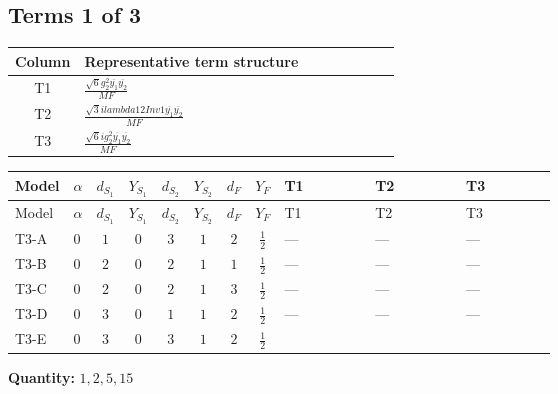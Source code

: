 \documentclass[8pt]{article}
\begin{document}
\begin{landscape}
\subsection*{Terms 1 of 3}
\begin{center}
\begin{tabular}{@{}c >{\raggedright\arraybackslash}p{0.82\linewidth}@{}}
\toprule
Column & Representative term structure \\
\midrule
T1 & \(\displaystyle \frac{\sqrt{6} g_{2}^{2} \overline{y_{1}} \overline{y_{2}}}{MF}\) \\
\midrule
T2 & \(\displaystyle \frac{\sqrt{3} i lambda12Inv1 \overline{y_{1}} \overline{y_{2}}}{MF}\) \\
\midrule
T3 & \(\displaystyle \frac{\sqrt{6} i g_{2}^{2} \overline{y_{1}} \overline{y_{2}}}{MF}\) \\
\midrule
\bottomrule
\end{tabular}
\end{center}
\smallskip
\tiny
\begin{longtable}{@{}llcccccc >{\raggedright\arraybackslash}p{0.21\linewidth} >{\raggedright\arraybackslash}p{0.21\linewidth} >{\raggedright\arraybackslash}p{0.21\linewidth}@{}}
\toprule
Model & $\alpha$ & $d_{S_1}$ & $Y_{S_1}$ & $d_{S_2}$ & $Y_{S_2}$ & $d_F$ & $Y_F$ & T1 & T2 & T3 \\
\midrule
\endfirsthead
\toprule
Model & $\alpha$ & $d_{S_1}$ & $Y_{S_1}$ & $d_{S_2}$ & $Y_{S_2}$ & $d_F$ & $Y_F$ & T1 & T2 & T3 \\
\midrule
\endhead
T3-A & $0$ & $1$ & $0$ & $3$ & $1$ & $2$ & $\frac{1}{2}$ & --- & --- & --- \\
\midrule
T3-B & $0$ & $2$ & $0$ & $2$ & $1$ & $1$ & $\frac{1}{2}$ & --- & --- & --- \\
\midrule
T3-C & $0$ & $2$ & $0$ & $2$ & $1$ & $3$ & $\frac{1}{2}$ & --- & --- & --- \\
\midrule
T3-D & $0$ & $3$ & $0$ & $1$ & $1$ & $2$ & $\frac{1}{2}$ & --- & --- & --- \\
\midrule
T3-E & $0$ & $3$ & $0$ & $3$ & $1$ & $2$ & $\frac{1}{2}$ & \scriptsize\adjustbox{max width=\linewidth}{$\begin{gathered} - \frac{\sqrt{6} g_{2}^{2} \overline{y_{1}} \overline{y_{2}}}{6 MF}\end{gathered}$} & \scriptsize\adjustbox{max width=\linewidth}{$\begin{gathered} - \frac{\sqrt{3} i lambda12Inv1 \overline{y_{1}} \overline{y_{2}}}{6 MF}\end{gathered}$} & \scriptsize\adjustbox{max width=\linewidth}{$\begin{gathered} \frac{\sqrt{6} i g_{2}^{2} \overline{y_{1}} \overline{y_{2}}}{6 MF}\end{gathered}$} \\
\midrule
\bottomrule
\end{longtable}
\clearpage
\noindent\textbf{Quantity: }$\mathrm{1,2,5,15}$\par\smallskip

\end{landscape}
\end{document}
